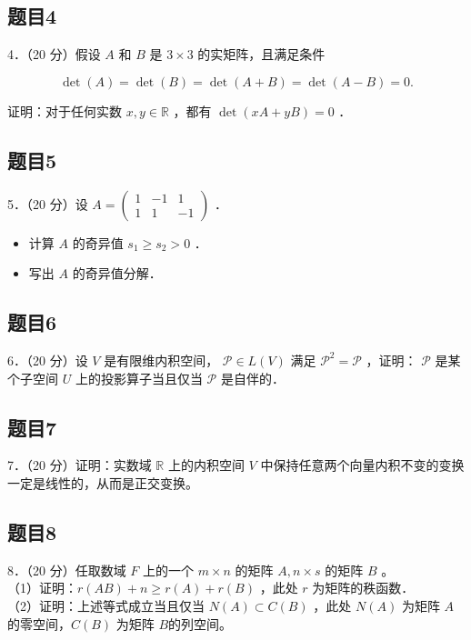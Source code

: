 \documentclass{article}
\begin{document}
\subsection{题目4}
4．（20 分）假设 \(A\) 和 \(B\) 是 \(3 \times 3\) 的实矩阵，且满足条件

\[
\operatorname{det}(A)=\operatorname{det}(B)=\operatorname{det}(A+B)=\operatorname{det}(A-B)=0 .
\]

证明：对于任何实数 \(x, y \in \mathbb{R}\) ，都有 \(\operatorname{det}(x A+y B)=0\) ．

\subsection{题目5}
5．（20 分）设 \(A=\left(\begin{array}{ccc}1 & -1 & 1 \\ 1 & 1 & -1\end{array}\right)\) ．

\begin{itemize}
  \item[（1）] 计算 \(A\) 的奇异值 \(s_{1} \geq s_{2}>0\) ．
  \item[（2）] 写出 \(A\) 的奇异值分解．
\end{itemize}

\subsection{题目6}
6．（20 分）设 \(V\) 是有限维内积空间， \(\mathcal{P} \in L(V)\) 满足 \(\mathcal{P}^{2}=\mathcal{P}\) ，证明： \(\mathcal{P}\) 是某个子空间 \(U\) 上的投影算子当且仅当 \(\mathcal{P}\) 是自伴的．

\subsection{题目7}
7．（20 分）证明：实数域 \(\mathbb{R}\) 上的内积空间 \(V\) 中保持任意两个向量内积不变的变换一定是线性的，从而是正交变换。

\subsection{题目8}
8．（20 分）任取数域 \(F\) 上的一个 \(m \times n\) 的矩阵 \(A, n \times s\) 的矩阵 \(B\) 。\\
（1）证明：\(r(A B)+n \geq r(A)+r(B)\) ，此处 \(r\) 为矩阵的秩函数．\\
（2）证明：上述等式成立当且仅当 \(N(A) \subset C(B)\) ，此处 \(N(A)\) 为矩阵 \(A\) 的零空间，\(C(B)\) 为矩阵 \(B\)的列空间。
\end{document}
